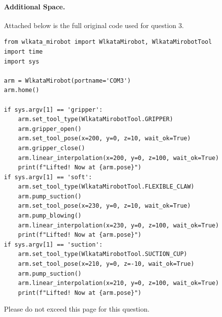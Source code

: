 \newpage
\paragraph{Additional Space.}
Attached below is the full original code used for question 3.
\begin{verbatim}
from wlkata_mirobot import WlkataMirobot, WlkataMirobotTool
import time
import sys

arm = WlkataMirobot(portname='COM3')
arm.home()

if sys.argv[1] == 'gripper':
    arm.set_tool_type(WlkataMirobotTool.GRIPPER)
    arm.gripper_open()
    arm.set_tool_pose(x=200, y=0, z=10, wait_ok=True)
    arm.gripper_close()
    arm.linear_interpolation(x=200, y=0, z=100, wait_ok=True)
    print(f"Lifted! Now at {arm.pose}")
if sys.argv[1] == 'soft':
    arm.set_tool_type(WlkataMirobotTool.FLEXIBLE_CLAW)
    arm.pump_suction()
    arm.set_tool_pose(x=230, y=0, z=10, wait_ok=True)
    arm.pump_blowing()
    arm.linear_interpolation(x=230, y=0, z=100, wait_ok=True)
    print(f"Lifted! Now at {arm.pose}")
if sys.argv[1] == 'suction':
    arm.set_tool_type(WlkataMirobotTool.SUCTION_CUP)
    arm.set_tool_pose(x=210, y=0, z=-10, wait_ok=True)
    arm.pump_suction()
    arm.linear_interpolation(x=210, y=0, z=100, wait_ok=True)
    print(f"Lifted! Now at {arm.pose}")
\end{verbatim}
Please do not exceed this page for this question.
